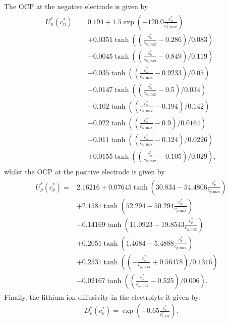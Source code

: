 \documentclass[preprint]{elsarticle}
\begin{document}
The OCP at the negative electrode is given by 
\begin{align}
	\begin{split} 
	U_n^*(c_n^*) = &0.194+1.5\exp\left(-120.0\frac{c_n^*}{c_{n,\text{max}}^*}\right)\\
     &+0.0351\tanh\left(\left(\frac{c_n^*}{c_{n,\text{max}}}-0.286\right)/0.083\right) \\ 
     &- 0.0045\tanh\left(\left(\frac{c_n^*}{c_{n,\text{max}}}-0.849\right)/0.119\right)\\
     &- 0.035\tanh\left(\left(\frac{c_n^*}{c_{n,\text{max}}}-0.9233\right)/0.05\right)\\
     &- 0.0147\tanh\left(\left(\frac{c_n^*}{c_{n,\text{max}}}-0.5\right)/0.034\right)\\
     &- 0.102\tanh\left(\left(\frac{c_n^*}{c_{n,\text{max}}}-0.194\right)/0.142\right)\\
     &- 0.022\tanh\left(\left(\frac{c_n^*}{c_{n,\text{max}}}-0.9\right)/0.0164\right)\\
     &- 0.011\tanh\left(\left(\frac{c_n^*}{c_{n,\text{max}}}-0.124\right)/0.0226\right)\\
     &+ 0.0155\tanh\left(\left(\frac{c_n^*}{c_{n,\text{max}}}-0.105\right)/0.029\right), 
     \end{split}
\end{align} 
whilst the OCP at the positive electrode is given by
\begin{align}
	\begin{split}
		U_p^*(c_p^*) = &2.16216+0.07645\tanh\left(30.834-54.4806\frac{c_p^*}{c_{p,\text{max}}}\right)\\
 					&+ 2.1581\tanh\left(52.294-50.294\frac{c_p^*}{c_{p,\text{max}}}\right) \\
 					&- 0.14169\tanh\left(11.0923-19.8543\frac{c_p^*}{c_{p,\text{max}}}\right) \\
 					&+ 0.2051\tanh\left(1.4684-5.4888\frac{c_p^*}{c_{p,\text{max}}}\right) \\
 					&+ 0.2531\tanh\left(\left(-\frac{c_p^*}{c_{p,\text{max}}}+0.56478\right)/0.1316\right) \\
					&- 0.02167\tanh\left(\left(\frac{c_p^*}{c_{p,\text{max}}}-0.525\right)/0.006\right).
	\end{split} 
\end{align} 
Finally, the lithium ion diffusivity in the electrolyte it given by: 
\begin{align} 
	D_e^*(c_e^*) = \exp\left( - 0.65 \frac{c_e^*}{c^*_{e,\text{ref}}}\right). 
\end{align} 
\end{document}
